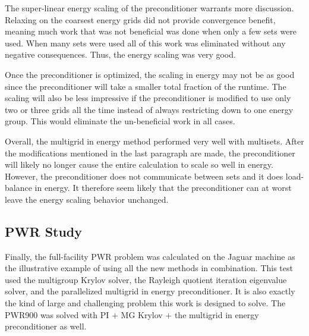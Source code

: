 The super-linear energy scaling of the preconditioner warrants more discussion. Relaxing on the coarsest energy grids did not provide convergence benefit, meaning much work that was not beneficial was done when only a few sets were used. When many sets were used all of this work was eliminated without any negative consequences. Thus, the energy scaling was very good.

Once the preconditioner is optimized, the scaling in energy may not be as good since the preconditioner will take a smaller total fraction of the runtime. The scaling will also be less impressive if the preconditioner is modified to use only two or three grids all the time instead of always restricting down to one energy group. This would eliminate the un-beneficial work in all cases. 

Overall, the multigrid in energy method performed very well with multisets. After the modifications mentioned in the last paragraph are made, the preconditioner will likely no longer cause the entire calculation to scale so well in energy. However, the preconditioner does not communicate between sets and it does load-balance in energy. It therefore seem likely that the preconditioner can at worst leave the energy scaling behavior unchanged. 

\subsection{PWR Study}
Finally, the full-facility PWR problem was calculated on the Jaguar machine as the illustrative example of using all the new methods in combination. This test used the multigroup Krylov solver, the Rayleigh quotient iteration eigenvalue solver, and the parallelized multigrid in energy preconditioner. It is also exactly the kind of large and challenging problem this work is designed to solve. The PWR900 was solved with PI + MG Krylov + the multigrid in energy preconditioner as well. 

